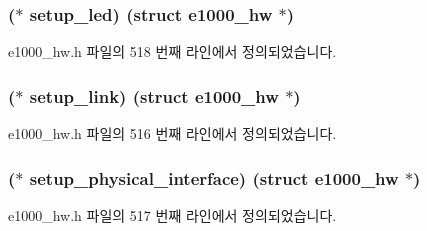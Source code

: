 \subsubsection[{\texorpdfstring{setup\+\_\+led}{setup_led}}]{($\ast$ setup\+\_\+led) (struct {\bf e1000\+\_\+hw} $\ast$)}\hypertarget{structe1000__mac__operations_aa079fcfdf0e2c9aafcdcbcb721a86496}{}\label{structe1000__mac__operations_aa079fcfdf0e2c9aafcdcbcb721a86496}


e1000\+\_\+hw.\+h 파일의 518 번째 라인에서 정의되었습니다.

\subsubsection[{\texorpdfstring{setup\+\_\+link}{setup_link}}]{($\ast$ setup\+\_\+link) (struct {\bf e1000\+\_\+hw} $\ast$)}\hypertarget{structe1000__mac__operations_ac8c0c6110e4112267f9b8b7bf1c42b54}{}\label{structe1000__mac__operations_ac8c0c6110e4112267f9b8b7bf1c42b54}


e1000\+\_\+hw.\+h 파일의 516 번째 라인에서 정의되었습니다.

\subsubsection[{\texorpdfstring{setup\+\_\+physical\+\_\+interface}{setup_physical_interface}}]{($\ast$ setup\+\_\+physical\+\_\+interface) (struct {\bf e1000\+\_\+hw} $\ast$)}\hypertarget{structe1000__mac__operations_aeb4ac8de52fc3cf7e49d7f83f36c2aa9}{}\label{structe1000__mac__operations_aeb4ac8de52fc3cf7e49d7f83f36c2aa9}


e1000\+\_\+hw.\+h 파일의 517 번째 라인에서 정의되었습니다.

